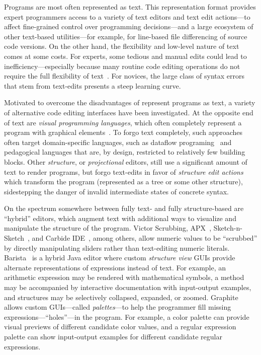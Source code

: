 
Programs are most often represented as text.
%
This representation format provides expert programmers access to a variety of
text editors and text edit actions---to affect fine-grained control over
programming decisions---and a large ecosystem of other text-based
utilities---for example, for line-based file differencing of source code
versions.
%
On the other hand, the flexibility and low-level nature of text comes at some
costs.
%
For experts, some tedious and manual edits could lead to
inefficiency---especially because many routine code editing operations do not
require the full flexibility of text~\citep{XXX}.
%
For novices, the large class of syntax errors that stem from text-edits presents
a steep learning curve.

Motivated to overcome the disadvantages of represent programs as text, a variety
of alternative code editing interfaces have been investigated.
%
At the opposite end of text are \emph{visual programming languages}, which often
completely represent a program with graphical elements~\citep{XXX}.
%
To forgo text completely, such approaches often target domain-specific
languages, such as dataflow programing~\citep{XXX} and pedagogical languages
that are, by design, restricted to relatively few building blocks.
%
Other \emph{structure}, or \emph{projectional} editors, still use a significant
amount of text to render programs, but forgo text-edits in favor of
\emph{structure edit actions} which transform the program (represented as a tree
or some other structure), sidestepping the danger of invalid intermediate states
of concrete syntax.

On the spectrum somewhere between fully text- and fully structure-based are
``hybrid'' editors, which augment text with additional ways to visualize and
manipulate the structure of the program.
%
Victor Scrubbing, APX~\citep{APX}, Sketch-n-Sketch~\citep{sns-pldi}, and Carbide
IDE~\citep{XXX}, among others, allow numeric values to be ``scrubbed'' by
directly manipulating sliders rather than text-editing numeric literals.
%
Barista~\cite{Barista} is a hybrid Java editor where custom \emph{structure
view} GUIs provide alternate representations of expressions instead of text.
%
For example, an arithmetic expression may be rendered with mathematical symbols,
a method may be accompanied by interactive documentation with input-output
examples, and structures may be selectively collapsed, expanded, or zoomed.
%
Graphite~\citep{Graphite} allows custom GUIs---called \emph{palettes}---to help
the programmer fill missing expressions---``holes''---in the program.
%
For example, a color palette can provide visual previews of different candidate
color values, and a regular expression palette can show input-output examples
for different candidate regular expressions.

